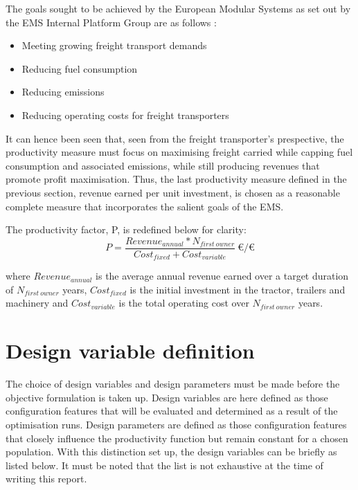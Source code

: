 \documentclass[ExampleMasters.tex]{subfiles}
\begin{document}
	The goals sought to be achieved by the European Modular Systems as set out by the EMS Internal Platform Group are as follows \cite{EMSleaflet}:
	\begin{itemize}
		\item Meeting growing freight transport demands
		\item Reducing fuel consumption
		\item Reducing emissions
		\item Reducing operating costs for freight transporters
	\end{itemize}


	It can hence been seen that, seen from the freight transporter's prespective, the productivity measure must focus on maximising freight carried while capping fuel consumption and associated emissions, while still producing revenues that promote profit maximisation. Thus, the last productivity measure defined in the previous section, revenue earned per unit investment, is chosen as a reasonable complete measure that incorporates the salient goals of the EMS. 

	The productivity factor, P, is redefined below for clarity:
	\begin{equation}
		P = \frac{Revenue_{annual}*N_{first\ owner}}{Cost_{fixed} + Cost_{variable}}\ \euro/\euro
	\end{equation}

	where $Revenue_{annual}$ is the average annual revenue earned over a target duration of $N_{first\ owner}$ years, $Cost_{fixed}$ is the initial investment in the tractor, trailers and machinery and $Cost_{variable}$ is the total operating cost over $N_{first\ owner}$ years.

	\section{Design variable definition}
		The choice of design variables and design parameters must be made before the objective formulation is taken up. Design variables are here defined as those configuration features that will be evaluated and determined as a result of the optimisation runs. Design parameters are defined as those configuration features that closely influence the productivity function but remain constant for a chosen population. With this distinction set up, the design variables can be briefly as listed below. It must be noted that the list is not exhaustive at the time of writing this report.
\end{document}
